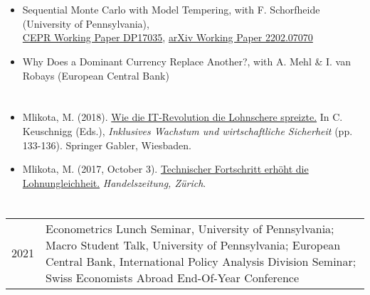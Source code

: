 \documentclass[letter,10pt]{article}
\newcommand{\spacebeforeitems}{\vspace*{8pt}}
\newcommand{\myEmph}[1]{#1}
\begin{document}
\section*{}

\spacebeforeitems

\begin{itemize}
	\item \myEmph{Sequential Monte Carlo with Model Tempering,} with F. Schorfheide (University of Pennsylvania), \\ \href{https://cepr.org/active/publications/discussion_papers/dp.php?dpno=17035}{CEPR Working Paper DP17035}, \href{https://arxiv.org/abs/2202.07070}{arXiv Working Paper 2202.07070}
	\item \myEmph{Why Does a Dominant Currency Replace Another?,} with A. Mehl \& I. van Robays (European Central Bank)
\end{itemize}



\section*{}

\spacebeforeitems

\begin{itemize}
	\item Mlikota, M. (2018). \href{https://doi.org/10.1007/978-3-658-21344-2_20}{Wie die IT-Revolution die Lohnschere spreizte.} In C. Keuschnigg (Eds.), \textit{Inklusives Wachstum und wirtschaftliche Sicherheit} (pp. 133-136). Springer Gabler, Wiesbaden.
	\item Mlikota, M. (2017, October 3). \href{https://www.handelszeitung.ch/blogs/free-lunch/technischer-fortschritt-erhoeht-die-lohnungleichheit-1494785}{Technischer Fortschritt erh\"oht die Lohnungleichheit.} \textit{Handelszeitung, Z\"urich}.
\end{itemize}



\section*{}

\begin{table}[h!]
	\begin{tabular}{p{2.5cm}p{15cm}}
		2021 	& Econometrics Lunch Seminar, University of Pennsylvania; Macro Student Talk, University of Pennsylvania; European Central Bank, International Policy Analysis Division Seminar; Swiss Economists Abroad End-Of-Year Conference\\
	\end{tabular}
\end{table}
\end{document}
